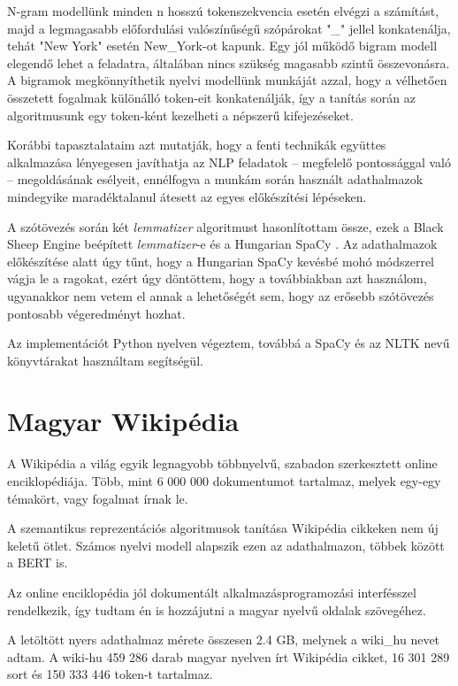 N-gram modellünk minden n hosszú tokenszekvencia esetén elvégzi a számítást, majd a legmagasabb előfordulási valószínűségű szópárokat "\_" jellel konkatenálja, tehát "New York" esetén New\_York-ot kapunk. Egy jól működő bigram modell elegendő lehet a feladatra, általában nincs szükség magasabb szintű összevonásra. A bigramok megkönnyíthetik nyelvi modellünk munkáját azzal, hogy a vélhetően összetett fogalmak különálló token-eit konkatenálják, így a tanítás során az algoritmusunk egy token-ként kezelheti a népszerű kifejezéseket.

Korábbi tapasztalataim azt mutatják, hogy a fenti technikák együttes alkalmazása lényegesen javíthatja az NLP feladatok – megfelelő pontossággal való – megoldásának esélyeit, ennélfogva a munkám során használt adathalmazok mindegyike maradéktalanul átesett az egyes előkészítési lépéseken.

A szótövezés során két \textit{lemmatizer} algoritmust hasonlítottam össze, ezek a Black Sheep \cite{bsi} Engine beépített \textit{lemmatizer}-e és a Hungarian SpaCy \cite{hunspacy}. Az adathalmazok előkészítése alatt úgy tűnt, hogy a Hungarian SpaCy kevésbé mohó módszerrel vágja le a ragokat, ezért úgy döntöttem, hogy a továbbiakban azt használom, ugyanakkor nem vetem el annak a lehetőségét sem, hogy az erősebb szótövezés pontosabb végeredményt hozhat. 

Az implementációt Python nyelven végeztem, továbbá a SpaCy \cite{spacy} és az NLTK \cite{nltk} nevű könyvtárakat használtam segítségül.

\section{Magyar Wikipédia}
A Wikipédia \cite{wikipedia} a világ egyik legnagyobb többnyelvű, szabadon szerkesztett online enciklopédiája. Több, mint 6 000 000 dokumentumot tartalmaz, melyek egy-egy témakört, vagy fogalmat írnak le.

A szemantikus reprezentációs algoritmusok tanítása Wikipédia cikkeken nem új keletű ötlet. Számos nyelvi modell alapszik ezen az adathalmazon, többek között a BERT is.

Az online enciklopédia jól dokumentált alkalmazásprogramozási interfésszel rendelkezik, így tudtam én is hozzájutni a magyar nyelvű oldalak szövegéhez.

A letöltött nyers adathalmaz mérete összesen 2.4 GB, melynek a wiki\_hu nevet adtam. A wiki-hu 459 286 darab magyar nyelven írt Wikipédia cikket, 16 301 289 sort és 150 333 446 token-t tartalmaz. 

